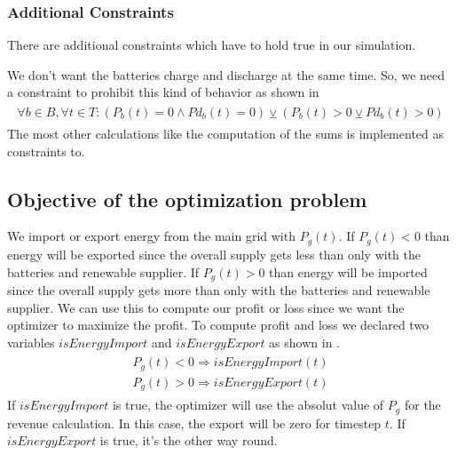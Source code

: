 \subsubsection{Additional Constraints}
There are additional constraints which have to hold true in our simulation.

We don't want the batteries charge and discharge at the same time.
So, we need a constraint to prohibit this kind of behavior as shown in 
\begin{align} \label{eq:batteryConstraint}
\begin{split}
\forall b \in B, \forall t \in T: (P_{b}(t) = 0 \wedge Pd_{b}(t) = 0) \veebar (P_{b}(t)>0 \veebar Pd_{b}(t)>0)
\end{split}
\end{align}
The most other calculations like the computation of the sums is implemented as constraints to.

\subsection{Objective of the optimization problem}
We import or export energy from the main grid with $P_{g}(t)$.
If $P_{g}(t) < 0$ than energy will be exported since the overall supply gets less than only with the batteries and renewable supplier.
If $P_{g}(t) > 0$ than energy will be imported since the overall supply gets more than only with the batteries and renewable supplier.
We can use this to compute our profit or loss since we want the optimizer to maximize the profit.
To compute profit and loss we declared two variables $isEnergyImport$ and $isEnergyExport$ as shown in .
\begin{align} \label{eq:importexport}
\begin{split}
P_{g}(t) < 0 \Rightarrow isEnergyImport(t)\\
P_{g}(t) > 0 \Rightarrow isEnergyExport(t)
\end{split}
\end{align}
If $isEnergyImport$ is true, the optimizer will use the absolut value of $P_{g}$ for the revenue calculation.
In this case, the export will be zero for timestep $t$.
If $isEnergyExport$ is true, it's the other way round.


